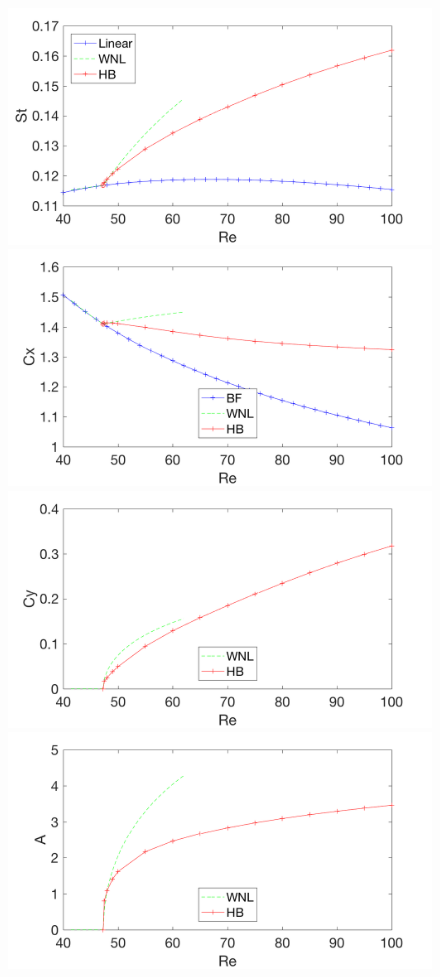 \documentclass[twocolumn,10pt]{asme2ej}
\begin{document}
\begin{figure}
\begin{center}
\includegraphics[width=.9 \linewidth]{Cylinder_Strouhal_Re_HB.png}
\includegraphics[width=.9 \linewidth]{Cylinder_Cx_Re_HB.png}
\includegraphics[width=.9 \linewidth]{Cylinder_Cy_Re_SC.png}
\includegraphics[width=.9 \linewidth]{Cylinder_Energy_Re_SC.png}

\end{center}
\end{figure}
\end{document}
